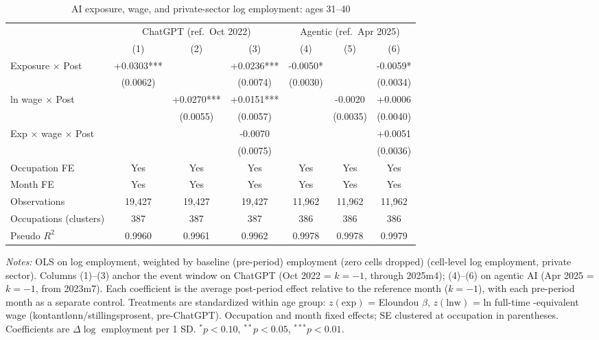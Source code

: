 \begin{table}[htbp]\centering
\caption{AI exposure, wage, and private-sector log employment: ages 31–40}
\label{tab:ca_did_age2}
\small
\begin{tabular}{lcccccc}
\toprule
 & \multicolumn{3}{c}{ChatGPT (ref.\ Oct 2022)} & \multicolumn{3}{c}{Agentic (ref.\ Apr 2025)} \\
\cmidrule(lr){2-4} \cmidrule(lr){5-7}
 & (1) & (2) & (3) & (4) & (5) & (6) \\
\midrule
Exposure $\times$ Post & +0.0303*** &  & +0.0236*** & -0.0050* &  & -0.0059* \\
 & (0.0062) &  & (0.0074) & (0.0030) &  & (0.0034) \\
ln wage $\times$ Post &  & +0.0270*** & +0.0151*** &  & -0.0020 & +0.0006 \\
 &  & (0.0055) & (0.0057) &  & (0.0035) & (0.0040) \\
Exp $\times$ wage $\times$ Post &  &  & -0.0070 &  &  & +0.0051 \\
 &  &  & (0.0075) &  &  & (0.0036) \\
\midrule
Occupation FE & Yes & Yes & Yes & Yes & Yes & Yes \\
Month FE & Yes & Yes & Yes & Yes & Yes & Yes \\
Observations & 19,427 & 19,427 & 19,427 & 11,962 & 11,962 & 11,962 \\
Occupations (clusters) & 387 & 387 & 387 & 386 & 386 & 386 \\
Pseudo $R^2$ & 0.9960 & 0.9961 & 0.9962 & 0.9978 & 0.9978 & 0.9979 \\
\bottomrule
\end{tabular}
\begin{minipage}{\linewidth}\vspace{2pt}\footnotesize
\emph{Notes:} OLS on log employment, weighted by baseline (pre-period) employment (zero cells dropped) (cell-level log employment, private sector). Columns (1)--(3) anchor the event window on ChatGPT (Oct 2022 = $k{=}{-}1$, through 2025m4); (4)--(6) on agentic AI (Apr 2025 = $k{=}{-}1$, from 2023m7). Each coefficient is the average post-period effect relative to the reference month ($k{=}{-}1$), with each pre-period month as a separate control. Treatments are standardized within age group: $z(\text{exp})$ = Eloundou $\beta$, $z(\text{lnw})$ = ln full-time -equivalent wage (kontantl\o nn$/$stillingsprosent, pre-ChatGPT). Occupation and month fixed effects; SE clustered at occupation in parentheses. Coefficients are $\Delta\log$ employment per 1 SD. $^{*}p<0.10$, $^{**}p<0.05$, $^{***}p<0.01$.
\end{minipage}
\end{table}